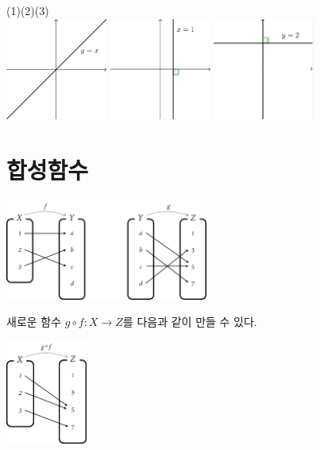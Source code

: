 \documentclass{oblivoir}
\begin{document}
%
\label{various10}
\begin{center}
(1)\hspace{100pt}(2)\hspace{100pt}(3)\\
\includegraphics[width=0.25\textwidth]{various_10-1}\qquad
\includegraphics[width=0.25\textwidth]{various_10-2}\qquad
\includegraphics[width=0.25\textwidth]{various_10-3}
\end{center}

\clearpage
\section{합성함수}
%
\label{composition1}
\begin{center}
\includegraphics[width=0.5\textwidth]{composition_1-1}
\end{center}
새로운 함수 \(g\circ f:X\to Z\)를 다음과 같이 만들 수 있다.
\begin{center}
\includegraphics[width=0.2\textwidth]{composition_1-2}
\end{center}
\end{document}
